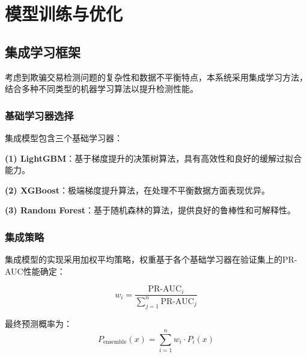\documentclass[12pt,a4paper]{article}
\begin{document}
\section{模型训练与优化}

\subsection{集成学习框架}

考虑到欺骗交易检测问题的复杂性和数据不平衡特点，本系统采用集成学习方法，结合多种不同类型的机器学习算法以提升检测性能。

\subsubsection{基础学习器选择}

集成模型包含三个基础学习器：

\textbf{(1) LightGBM}：基于梯度提升的决策树算法，具有高效性和良好的缓解过拟合能力。

\textbf{(2) XGBoost}：极端梯度提升算法，在处理不平衡数据方面表现优异。

\textbf{(3) Random Forest}：基于随机森林的算法，提供良好的鲁棒性和可解释性。

\subsubsection{集成策略}

集成模型的实现采用加权平均策略，权重基于各个基础学习器在验证集上的PR-AUC性能确定：

$$w_i = \frac{\text{PR-AUC}_i}{\sum_{j=1}^{n} \text{PR-AUC}_j}$$

最终预测概率为：
$$P_{\text{ensemble}}(x) = \sum_{i=1}^{n} w_i \cdot P_i(x)$$
\end{document}
